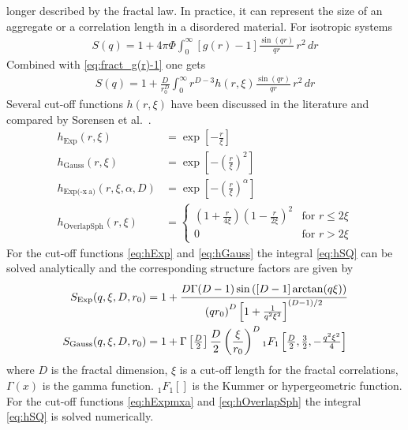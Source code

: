 longer described by the fractal law. In practice, it can
represent the size of an aggregate or a correlation
length in a disordered material.
For isotropic systems
\begin{align}
S(q) = 1+4\pi\Phi\int_0^\infty [g(r)-1] \frac{\sin(qr)}{qr} \, r^2 \, dr
\end{align}
Combined with \ref{eq:fract_g(r)-1} one gets
\begin{align}
S(q) = 1 +\frac{D}{r_0^D} \int_0^\infty r^{D-3} h(r,\xi)  \frac{\sin(qr)}{qr}\, r^2 \, dr
\label{eq:hSQ}
\end{align}
Several cut-off functions $h(r,\xi)$ have been discussed in the
literature and compared by Sorensen et al.\
\cite{Sorensen1999,Sorensen1992}.
\begin{align}
h_\text{Exp}(r,\xi)     &= \exp\left[-\tfrac{r}{\xi}\right] \label{eq:hExp}\\
h_\text{Gauss}(r,\xi)   &= \exp\left[-\left(\tfrac{r}{\xi}\right)^2\right] \label{eq:hGauss}\\
h_\text{Exp(-x$\hat{~}$a)}(r,\xi,\alpha,D) &= \exp\left[-\left(\tfrac{r}{\xi}\right)^\alpha\right] \label{eq:hExpmxa}\\
h_\text{OverlapSph}(r,\xi)   &=
\begin{cases}
\left(1+\frac{r}{4\xi}\right)\left(1-\frac{r}{2\xi}\right)^2
& \text{for } r\leq 2\xi \\
0 & \text{for } r>2\xi
\end{cases}
\label{eq:hOverlapSph}
\end{align}
For the cut-off functions \ref{eq:hExp} and \ref{eq:hGauss} the integral \ref{eq:hSQ} can be solved
analytically and the corresponding structure factors are given by
\begin{align}
S_\text{Exp}(q,\xi,D,r_0) &= 1 +  \cfrac{D \Gamma(D-1)
\sin\left([D-1]\arctan(q \xi)\right)}{\left( q r_0\right)^D
\left[1+\tfrac{1}{q^2\xi^2}\right]^{(D-1)/2}} \\
S_\text{Gauss}(q,\xi,D,r_0) &= 1 +
    \Gamma\left[\tfrac{D}{2}\right]\frac{D}{2}
    \left(\frac{\xi}{r_0}\right)^D
    {}_1F_1\left[\tfrac{D}{2},\tfrac{3}{2},-\tfrac{q^2\xi^2}{4}\right]
\end{align}
where $D$ is the fractal dimension, $\xi$ is a cut-off length for
the fractal correlations, $\Gamma(x)$ is the gamma function.
${}_1F_1\left[\right]$ is the Kummer or hypergeometric function. For
the cut-off functions \ref{eq:hExpmxa} and \ref{eq:hOverlapSph} the
integral \ref{eq:hSQ} is solved numerically.

